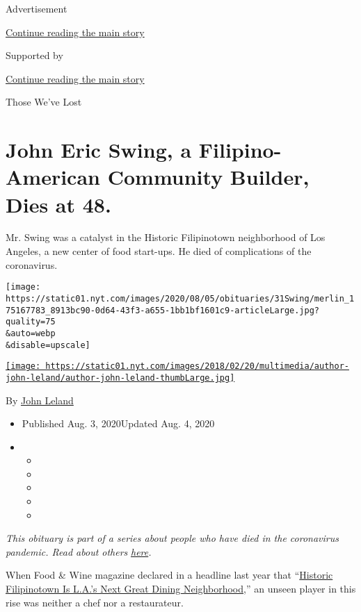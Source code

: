 Advertisement

\protect\hyperlink{after-top}{Continue reading the main story}

Supported by

\protect\hyperlink{after-sponsor}{Continue reading the main story}

Those We've Lost

\hypertarget{john-eric-swing-a-filipino-american-community-builder-dies-at-48}{%
\section{John Eric Swing, a Filipino-American Community Builder, Dies at
48.}\label{john-eric-swing-a-filipino-american-community-builder-dies-at-48}}

Mr. Swing was a catalyst in the Historic Filipinotown neighborhood of
Los Angeles, a new center of food start-ups. He died of complications of
the coronavirus.

\texttt{[image: https://static01.nyt.com/images/2020/08/05/obituaries/31Swing/merlin\_175167783\_8913bc90-0d64-43f3-a655-1bb1bf1601c9-articleLarge.jpg?quality=75\\\&auto=webp\\\&disable=upscale]}

\href{https://www.nytimes.com/by/john-leland}{\texttt{[image: https://static01.nyt.com/images/2018/02/20/multimedia/author-john-leland/author-john-leland-thumbLarge.jpg]}}

By \href{https://www.nytimes.com/by/john-leland}{John Leland}

\begin{itemize}
\item
  Published Aug. 3, 2020Updated Aug. 4, 2020
\item
  \begin{itemize}
  \item
  \item
  \item
  \item
  \item
  \end{itemize}
\end{itemize}

\emph{This obituary is part of a series about people who have died in
the coronavirus pandemic. Read about others}
\href{https://www.nytimes.com/interactive/2020/obituaries/people-died-coronavirus-obituaries.html}{\emph{here}}\emph{.}

When Food \& Wine magazine declared in a headline last year that
``\href{https://www.foodandwine.com/travel/restaurants/historic-filipinotown-restaurants-los-angeles}{Historic
Filipinotown Is L.A.'s Next Great Dining Neighborhood},'' an unseen
player in this rise was neither a chef nor a restaurateur.


